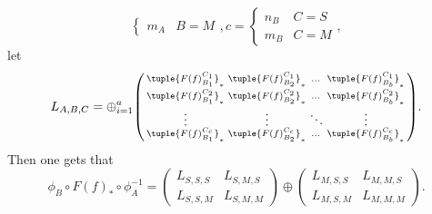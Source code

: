 \begin{remark}
\[\begin{cases}
            m_A & B = M
        \end{cases},
        c =
        \begin{cases}
            n_B & C = S \\
            m_B & C = M
        \end{cases},
    \]
    let
    \[
        L_{A, B, C} = \oplus_{i = 1}^{a}
        \begin{psmallmatrix}
            \tuple{ F(f)_{B_1}^{C_1} }_* &
            \tuple{ F(f)_{B_2}^{C_1} }_* &
            \dots &
            \tuple{ F(f)_{B_b}^{C_1} }_* \\
            \tuple{ F(f)_{B_1}^{C_2} }_* &
            \tuple{ F(f)_{B_2}^{C_2} }_* &
            \dots &
            \tuple{ F(f)_{B_b}^{C_2} }_* \\
            \vdots & \vdots & \ddots & \vdots \\
            \tuple{ F(f)_{B_1}^{C_c} }_* &
            \tuple{ F(f)_{B_2}^{C_c} }_* &
            \dots &
            \tuple{ F(f)_{B_b}^{C_c} }_* \\
        \end{psmallmatrix}.
    \]
    Then one gets that
    \[
        \phi_B \circ F(f)_* \circ \phi_A^{-1} =
        \begin{pmatrix}
            L_{S, S, S} & L_{S, M, S} \\
            L_{S, S, M } & L_{S, M, M}
        \end{pmatrix}
        \oplus
        \begin{pmatrix}
            L_{M, S, S} & L_{M, M, S} \\
            L_{M, S, M} & L_{M, M, M}
        \end{pmatrix}.
    \]
\end{remark}

